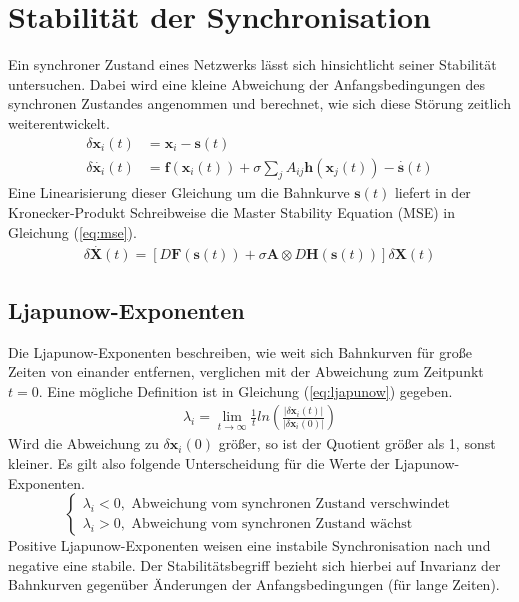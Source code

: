 \section{Stabilität der Synchronisation}
Ein synchroner Zustand eines Netzwerks lässt sich hinsichtlicht seiner Stabilität untersuchen. Dabei wird eine kleine Abweichung der Anfangsbedingungen des synchronen Zustandes angenommen und berechnet, wie sich diese Störung zeitlich weiterentwickelt.
\begin{align}\label{eq:deltaxi}
\delta \boldsymbol{x}_i(t) &= \boldsymbol{x}_i - \boldsymbol{s}(t)\\
\delta \overset{\cdot}{\boldsymbol{x}}_i(t) &= \boldsymbol{f}(\boldsymbol{x}_i(t))+\sigma\sum_j A_{ij}\boldsymbol{h}\left(\boldsymbol{x}_j(t)\right) - \overset{\cdot}{\boldsymbol{s}}(t)
\end{align}
Eine Linearisierung dieser Gleichung um die Bahnkurve $\boldsymbol{s}(t)$ liefert in der Kronecker-Produkt Schreibweise die Master Stability Equation (MSE) in Gleichung (\ref*{eq:mse}).
\begin{align}\label{eq:mse}
\delta\overset{\cdot}{\boldsymbol{X}}(t)=
\left[D\boldsymbol{F}(\boldsymbol{s}(t))+\sigma\boldsymbol{A}\otimes D\boldsymbol{H}(\boldsymbol{s}(t))\right]\delta\boldsymbol{X}(t)
\end{align}

\subsection{Ljapunow-Exponenten}
Die Ljapunow-Exponenten beschreiben, wie weit sich Bahnkurven für große Zeiten von einander entfernen, verglichen mit der Abweichung zum Zeitpunkt $t=0$. Eine mögliche Definition ist in Gleichung (\ref{eq:ljapunow}) gegeben.
\begin{align}\label{eq:ljapunow}
\lambda_i=\lim_{t\rightarrow\infty}\frac{1}{t} ln\left(\frac{|\delta \boldsymbol{x}_i(t)|}{|\delta \boldsymbol{x}_i(0)|}\right)
\end{align}
Wird die Abweichung zu $\delta\boldsymbol{x}_i(0)$ größer, so ist der Quotient größer als 1, sonst kleiner. Es gilt also folgende Unterscheidung für die Werte der Ljapunow-Exponenten.
\begin{equation}
\begin{cases}
\lambda_i < 0, \text{ Abweichung vom synchronen Zustand verschwindet}\\
\lambda_i > 0, \text{ Abweichung vom synchronen Zustand wächst}
\end{cases}
\end{equation}
Positive Ljapunow-Exponenten weisen eine instabile Synchronisation nach und negative eine stabile. Der Stabilitätsbegriff bezieht sich hierbei auf Invarianz der Bahnkurven gegenüber Änderungen der Anfangsbedingungen (für lange Zeiten). 
